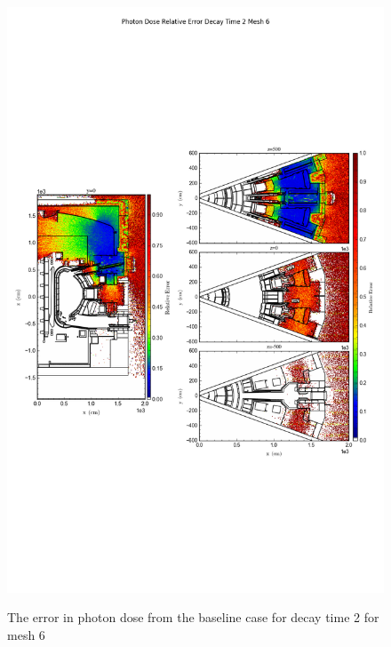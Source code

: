 \begin{figure}[ht!]
\centering
\includegraphics[trim={0cm 9cm 0cm 10cm},clip,scale=0.75]{../plots/final_model/Photon_Dose_Relative_Error_Decay_Time_2_Mesh_6.png}
\label{fig:photons_dc2_no4bc_m6_error}
\caption{The error in photon dose from the baseline case for decay time 2 for mesh 6}
\end{figure}
